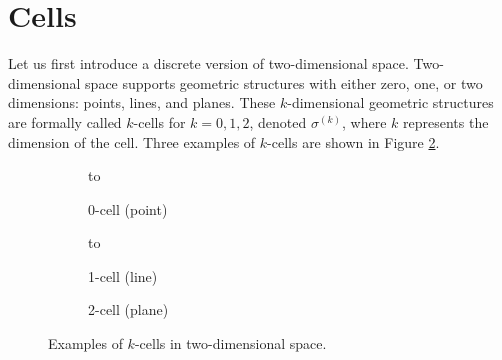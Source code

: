 \section{Cells}

Let us first introduce a discrete version of two-dimensional space. Two-dimensional space supports geometric structures with either zero, one, or two dimensions: points, lines, and planes. These $k$-dimensional geometric structures are formally called $k$-cells for $k = 0, 1, 2$, denoted $\sigma^{(k)}$, where $k$ represents the dimension of the cell. Three examples of $k$-cells are shown in Figure \ref{fig:cells}.
\begin{figure}[ht]
    \newsavebox\boxCell
    \centering
    \begin{subfigure}[c]{0.3\textwidth}
        \centering
        \vbox to \ht{}
        \caption{0-cell (point)}
    \end{subfigure}
    \begin{subfigure}[c]{0.3\textwidth}
        \centering
        \vbox to \ht{}
        \caption{1-cell (line)}
    \end{subfigure}
    \begin{subfigure}[c]{0.3\textwidth}
        \centering
        \usebox{\boxCell}
        \caption{2-cell (plane)}
        \label{fig:2cell}
    \end{subfigure}
    \caption{Examples of $k$-cells in two-dimensional space.}
    \label{fig:cells}
\end{figure}

